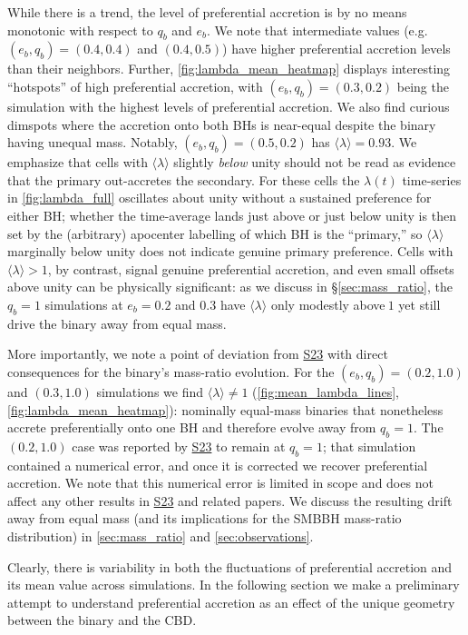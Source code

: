 \documentclass[fleqn,usenatbib]{mnras}
\newcommand{\Stwentythree}{\href{https://doi.org/10.1093/mnras/stac3263}{S23}\xspace}
\begin{document}
While there is a trend, the level of preferential accretion is by no means monotonic with respect to $q_b$ and $e_b$. We note that intermediate values (e.g.\ $(e_b, q_b) = (0.4, 0.4)$ and $(0.4, 0.5)$) have higher preferential accretion levels than their neighbors. Further, \autoref{fig:lambda_mean_heatmap} displays interesting ``hotspots'' of high preferential accretion, with $(e_b, q_b) = (0.3, 0.2)$ being the simulation with the highest levels of preferential accretion. We also find curious dimspots where the accretion onto both BHs is near-equal despite the binary having unequal mass. Notably, $(e_b, q_b) = (0.5, 0.2)$ has $\langle \lambda \rangle = 0.93$. We emphasize that cells with $\langle\lambda\rangle$ slightly \emph{below} unity should not be read as evidence that the primary out-accretes the secondary. For these cells the $\lambda(t)$ time-series in \autoref{fig:lambda_full} oscillates about unity without a sustained preference for either BH; whether the time-average lands just above or just below unity is then set by the (arbitrary) apocenter labelling of which BH is the ``primary,'' so $\langle\lambda\rangle$ marginally below unity does not indicate genuine primary preference. Cells with $\langle\lambda\rangle > 1$, by contrast, signal genuine preferential accretion, and even small offsets above unity can be physically significant: as we discuss in \S\ref{sec:mass_ratio}, the $q_b = 1$ simulations at $e_b = 0.2$ and $0.3$ have $\langle\lambda\rangle$ only modestly above$\ 1$ yet still drive the binary away from equal mass.

More importantly, we note a point of deviation from \Stwentythree with direct consequences for the binary's mass-ratio evolution. For the $(e_b, q_b) = (0.2, 1.0)$ and $(0.3, 1.0)$ simulations we find $\langle \lambda \rangle \neq 1$ (\autoref{fig:mean_lambda_lines}, \autoref{fig:lambda_mean_heatmap}): nominally equal-mass binaries that nonetheless accrete preferentially onto one BH and therefore evolve away from $q_b = 1$. The $(0.2, 1.0)$ case was reported by \Stwentythree to remain at $q_b = 1$; that simulation contained a numerical error, and once it is corrected we recover preferential accretion. We note that this numerical error is limited in scope and does not affect any other results in \Stwentythree and related papers. We discuss the resulting drift away from equal mass (and its implications for the SMBBH mass-ratio distribution) in \autoref{sec:mass_ratio} and \autoref{sec:observations}.

Clearly, there is variability in both the fluctuations of preferential accretion and its mean value across simulations. In the following section we make a preliminary attempt to understand preferential accretion as an effect of the unique geometry between the binary and the CBD.
\end{document}

